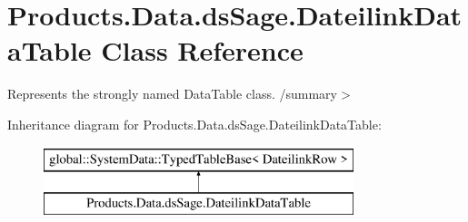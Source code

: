 \hypertarget{class_products_1_1_data_1_1ds_sage_1_1_dateilink_data_table}{}\section{Products.\+Data.\+ds\+Sage.\+Dateilink\+Data\+Table Class Reference}
\label{class_products_1_1_data_1_1ds_sage_1_1_dateilink_data_table}


Represents the strongly named Data\+Table class. /summary$>$  


Inheritance diagram for Products.\+Data.\+ds\+Sage.\+Dateilink\+Data\+Table\+:\begin{figure}[H]
\begin{center}
\leavevmode
\includegraphics[height=2.000000cm]{class_products_1_1_data_1_1ds_sage_1_1_dateilink_data_table}
\end{center}
\end{figure}
